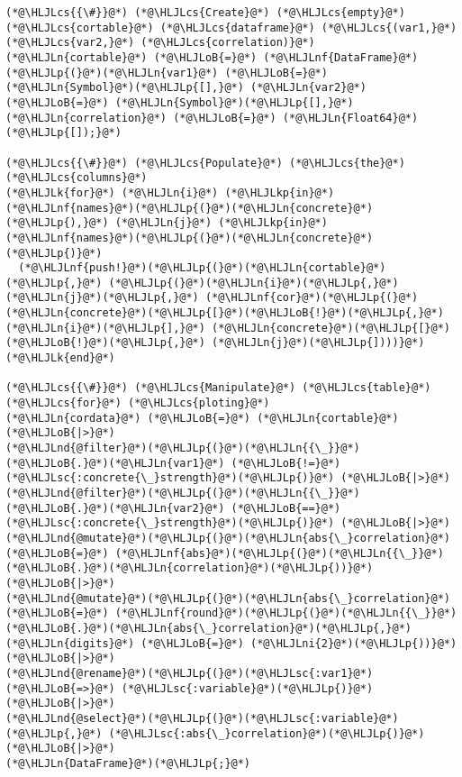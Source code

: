 \documentclass[12pt,a4paper]{article}
\newcommand{\HLJLk}[1]{\textcolor[RGB]{148,91,176}{\textbf{#1}}}
\newcommand{\HLJLkp}[1]{\textcolor[RGB]{148,91,176}{\textbf{#1}}}
\newcommand{\HLJLn}[1]{#1}
\newcommand{\HLJLnd}[1]{\textcolor[RGB]{214,102,97}{#1}}
\newcommand{\HLJLnf}[1]{\textcolor[RGB]{66,102,213}{#1}}
\newcommand{\HLJLsc}[1]{\textcolor[RGB]{201,61,57}{#1}}
\newcommand{\HLJLni}[1]{\textcolor[RGB]{59,151,46}{#1}}
\newcommand{\HLJLoB}[1]{\textcolor[RGB]{102,102,102}{\textbf{#1}}}
\newcommand{\HLJLp}[1]{#1}
\newcommand{\HLJLcs}[1]{\textcolor[RGB]{153,153,119}{\textit{#1}}}
\begin{document}
\begin{lstlisting}
(*@\HLJLcs{{\#}}@*) (*@\HLJLcs{Create}@*) (*@\HLJLcs{empty}@*) (*@\HLJLcs{cortable}@*) (*@\HLJLcs{dataframe}@*) (*@\HLJLcs{(var1,}@*) (*@\HLJLcs{var2,}@*) (*@\HLJLcs{correlation)}@*)
(*@\HLJLn{cortable}@*) (*@\HLJLoB{=}@*) (*@\HLJLnf{DataFrame}@*)(*@\HLJLp{(}@*)(*@\HLJLn{var1}@*) (*@\HLJLoB{=}@*) (*@\HLJLn{Symbol}@*)(*@\HLJLp{[],}@*) (*@\HLJLn{var2}@*) (*@\HLJLoB{=}@*) (*@\HLJLn{Symbol}@*)(*@\HLJLp{[],}@*) (*@\HLJLn{correlation}@*) (*@\HLJLoB{=}@*) (*@\HLJLn{Float64}@*)(*@\HLJLp{[]);}@*)

(*@\HLJLcs{{\#}}@*) (*@\HLJLcs{Populate}@*) (*@\HLJLcs{the}@*) (*@\HLJLcs{columns}@*)
(*@\HLJLk{for}@*) (*@\HLJLn{i}@*) (*@\HLJLkp{in}@*) (*@\HLJLnf{names}@*)(*@\HLJLp{(}@*)(*@\HLJLn{concrete}@*)(*@\HLJLp{),}@*) (*@\HLJLn{j}@*) (*@\HLJLkp{in}@*) (*@\HLJLnf{names}@*)(*@\HLJLp{(}@*)(*@\HLJLn{concrete}@*)(*@\HLJLp{)}@*)
  (*@\HLJLnf{push!}@*)(*@\HLJLp{(}@*)(*@\HLJLn{cortable}@*)(*@\HLJLp{,}@*) (*@\HLJLp{(}@*)(*@\HLJLn{i}@*)(*@\HLJLp{,}@*) (*@\HLJLn{j}@*)(*@\HLJLp{,}@*) (*@\HLJLnf{cor}@*)(*@\HLJLp{(}@*)(*@\HLJLn{concrete}@*)(*@\HLJLp{[}@*)(*@\HLJLoB{!}@*)(*@\HLJLp{,}@*) (*@\HLJLn{i}@*)(*@\HLJLp{],}@*) (*@\HLJLn{concrete}@*)(*@\HLJLp{[}@*)(*@\HLJLoB{!}@*)(*@\HLJLp{,}@*) (*@\HLJLn{j}@*)(*@\HLJLp{])))}@*)
(*@\HLJLk{end}@*)

(*@\HLJLcs{{\#}}@*) (*@\HLJLcs{Manipulate}@*) (*@\HLJLcs{table}@*) (*@\HLJLcs{for}@*) (*@\HLJLcs{ploting}@*) 
(*@\HLJLn{cordata}@*) (*@\HLJLoB{=}@*) (*@\HLJLn{cortable}@*) (*@\HLJLoB{|>}@*)
(*@\HLJLnd{@filter}@*)(*@\HLJLp{(}@*)(*@\HLJLn{{\_}}@*)(*@\HLJLoB{.}@*)(*@\HLJLn{var1}@*) (*@\HLJLoB{!=}@*) (*@\HLJLsc{:concrete{\_}strength}@*)(*@\HLJLp{)}@*) (*@\HLJLoB{|>}@*)
(*@\HLJLnd{@filter}@*)(*@\HLJLp{(}@*)(*@\HLJLn{{\_}}@*)(*@\HLJLoB{.}@*)(*@\HLJLn{var2}@*) (*@\HLJLoB{==}@*) (*@\HLJLsc{:concrete{\_}strength}@*)(*@\HLJLp{)}@*) (*@\HLJLoB{|>}@*)
(*@\HLJLnd{@mutate}@*)(*@\HLJLp{(}@*)(*@\HLJLn{abs{\_}correlation}@*) (*@\HLJLoB{=}@*) (*@\HLJLnf{abs}@*)(*@\HLJLp{(}@*)(*@\HLJLn{{\_}}@*)(*@\HLJLoB{.}@*)(*@\HLJLn{correlation}@*)(*@\HLJLp{))}@*) (*@\HLJLoB{|>}@*)
(*@\HLJLnd{@mutate}@*)(*@\HLJLp{(}@*)(*@\HLJLn{abs{\_}correlation}@*) (*@\HLJLoB{=}@*) (*@\HLJLnf{round}@*)(*@\HLJLp{(}@*)(*@\HLJLn{{\_}}@*)(*@\HLJLoB{.}@*)(*@\HLJLn{abs{\_}correlation}@*)(*@\HLJLp{,}@*) (*@\HLJLn{digits}@*) (*@\HLJLoB{=}@*) (*@\HLJLni{2}@*)(*@\HLJLp{))}@*) (*@\HLJLoB{|>}@*)
(*@\HLJLnd{@rename}@*)(*@\HLJLp{(}@*)(*@\HLJLsc{:var1}@*) (*@\HLJLoB{=>}@*) (*@\HLJLsc{:variable}@*)(*@\HLJLp{)}@*) (*@\HLJLoB{|>}@*)
(*@\HLJLnd{@select}@*)(*@\HLJLp{(}@*)(*@\HLJLsc{:variable}@*)(*@\HLJLp{,}@*) (*@\HLJLsc{:abs{\_}correlation}@*)(*@\HLJLp{)}@*) (*@\HLJLoB{|>}@*)
(*@\HLJLn{DataFrame}@*)(*@\HLJLp{;}@*)



\end{lstlisting}
\end{document}
